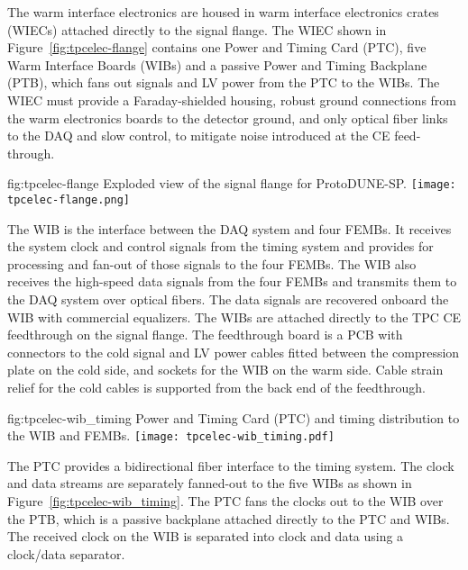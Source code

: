 The warm interface electronics are housed in warm interface electronics crates (WIECs)
attached directly to the signal flange.  The WIEC shown in Figure~\ref{fig:tpcelec-flange} 
contains one
Power and Timing Card (PTC), five Warm Interface Boards (WIBs) and a passive
Power and Timing Backplane (PTB), which fans out signals and LV power from the PTC to the WIBs. The WIEC must provide a Faraday-shielded housing, robust ground connections from the warm electronics boards to the detector ground, and only optical fiber links to the DAQ and slow control, to mitigate noise introduced at the CE feed-through.

\begin{dunefigure}
{fig:tpcelec-flange}
{Exploded view of the signal flange for ProtoDUNE-SP.}
\texttt{[image: tpcelec-flange.png]}
\end{dunefigure}

The WIB is the interface between the
DAQ system and four
FEMBs. It receives the system clock and control signals from the
timing system and provides for processing and fan-out of those signals to the four
FEMBs. The WIB also receives the high-speed data signals from the four 
FEMBs and transmits them to the DAQ system over optical
fibers. The data signals are recovered onboard the WIB with commercial equalizers. The WIBs are attached directly to the TPC
CE feedthrough on the signal flange. The feedthrough
board is a PCB with connectors to the cold signal and LV power cables fitted
between the compression plate on the cold side, and sockets for
the WIB on the warm side. Cable strain relief for the cold cables is 
supported from the back end of the feedthrough.

\begin{dunefigure}
{fig:tpcelec-wib_timing}
{Power and Timing Card (PTC) and timing distribution to the WIB and FEMBs.}
\texttt{[image: tpcelec-wib\_timing.pdf]}
\end{dunefigure}

The PTC provides a bidirectional fiber interface to the
timing system.  The clock and data
streams are separately fanned-out to the five WIBs as shown in
Figure~\ref{fig:tpcelec-wib_timing}. The PTC fans the clocks out to the WIB over the
PTB, which is a passive backplane attached directly to the PTC and
WIBs.  The received clock on the WIB is separated into clock and
data using a clock/data separator.


